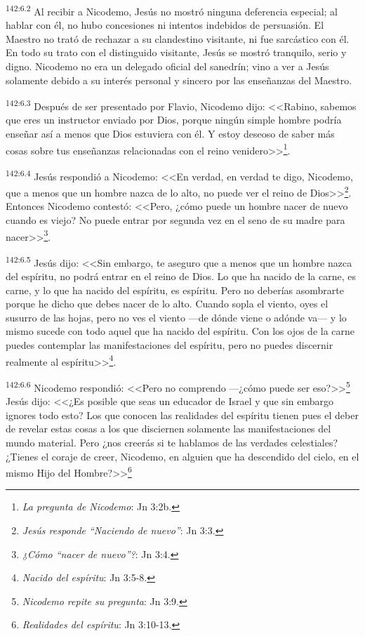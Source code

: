 \par 
\textsuperscript{142:6.2} Al recibir a Nicodemo, Jesús no mostró ninguna deferencia especial; al hablar con él, no hubo concesiones ni intentos indebidos de persuasión. El Maestro no trató de rechazar a su clandestino visitante, ni fue sarcástico con él. En todo su trato con el distinguido visitante, Jesús se mostró tranquilo, serio y digno. Nicodemo no era un delegado oficial del sanedrín; vino a ver a Jesús solamente debido a su interés personal y sincero por las enseñanzas del Maestro.

\par 
\textsuperscript{142:6.3} Después de ser presentado por Flavio, Nicodemo dijo: <<Rabino, sabemos que eres un instructor enviado por Dios, porque ningún simple hombre podría enseñar así a menos que Dios estuviera con él. Y estoy deseoso de saber más cosas sobre tus enseñanzas relacionadas con el reino venidero>>\footnote{\textit{La pregunta de Nicodemo}: Jn 3:2b.}.

\par 
\textsuperscript{142:6.4} Jesús respondió a Nicodemo: <<En verdad, en verdad te digo, Nicodemo, que a menos que un hombre nazca de lo alto, no puede ver el reino de Dios>>\footnote{\textit{Jesús responde ``Naciendo de nuevo''}: Jn 3:3.}. Entonces Nicodemo contestó: <<Pero, ¿cómo puede un hombre nacer de nuevo cuando es viejo? No puede entrar por segunda vez en el seno de su madre para nacer>>\footnote{\textit{¿Cómo ``nacer de nuevo''?}: Jn 3:4.}.

\par 
\textsuperscript{142:6.5} Jesús dijo: <<Sin embargo, te aseguro que a menos que un hombre nazca del espíritu, no podrá entrar en el reino de Dios. Lo que ha nacido de la carne, es carne, y lo que ha nacido del espíritu, es espíritu. Pero no deberías asombrarte porque he dicho que debes nacer de lo alto. Cuando sopla el viento, oyes el susurro de las hojas, pero no ves el viento ---de dónde viene o adónde va--- y lo mismo sucede con todo aquel que ha nacido del espíritu. Con los ojos de la carne puedes contemplar las manifestaciones del espíritu, pero no puedes discernir realmente al espíritu>>\footnote{\textit{Nacido del espíritu}: Jn 3:5-8.}.

\par 
\textsuperscript{142:6.6} Nicodemo respondió: <<Pero no comprendo ---¿cómo puede ser eso?>>\footnote{\textit{Nicodemo repite su pregunta}: Jn 3:9.} Jesús dijo: <<¿Es posible que seas un educador de Israel y que sin embargo ignores todo esto? Los que conocen las realidades del espíritu tienen pues el deber de revelar estas cosas a los que disciernen solamente las manifestaciones del mundo material. Pero ¿nos creerás si te hablamos de las verdades celestiales? ¿Tienes el coraje de creer, Nicodemo, en alguien que ha descendido del cielo, en el mismo Hijo del Hombre?>>\footnote{\textit{Realidades del espíritu}: Jn 3:10-13.}

